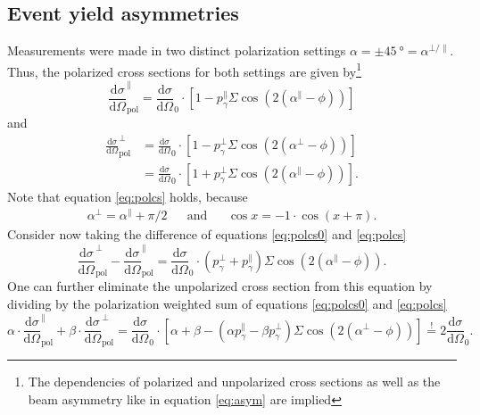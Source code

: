 \subsection{Event yield asymmetries}
Measurements were made in two distinct polarization settings $\alpha=\pm\SI{45}{\degree}=\alpha^{\bot/\parallel}$. Thus, the polarized cross sections for both settings are given by\footnote{The dependencies of polarized and unpolarized cross sections as well as the beam asymmetry like in equation \eqref{eq:asym} are implied}
\begin{equation}
	\frac{\text{d}\sigma}{\text{d}\Omega}_\text{pol}^\parallel=\frac{\text{d}\sigma}{\text{d}\Omega}_0\cdot\left[1-p_\gamma^\parallel\Sigma\cos\left(2\left(\alpha^\parallel-\phi\right)\right)\right]
	\label{eq:polcs0}
\end{equation}
and 
\begin{align}
	\frac{\text{d}\sigma}{\text{d}\Omega}_\text{pol}^\bot&=\frac{\text{d}\sigma}{\text{d}\Omega}_0\cdot\left[1-p_\gamma^\bot\Sigma\cos\left(2\left(\alpha^\bot-\phi\right)\right)\right]\label{eq:polcs00}\\
	&=\frac{\text{d}\sigma}{\text{d}\Omega}_0\cdot\left[1+p_\gamma^\bot\Sigma\cos\left(2\left(\alpha^\parallel-\phi\right)\right)\right].\label{eq:polcs}
\end{align}
Note that equation \eqref{eq:polcs} holds, because 
\begin{align*}
	\alpha^\bot=\alpha^\parallel+\pi/2 &&\text{and}&&\cos x = -1\cdot\cos(x+\pi).
\end{align*}
Consider now taking the difference of equations \eqref{eq:polcs0} and \eqref{eq:polcs}
\begin{equation}
	\frac{\text{d}\sigma}{\text{d}\Omega}_\text{pol}^\bot-\frac{\text{d}\sigma}{\text{d}\Omega}_\text{pol}^\parallel=\frac{\text{d}\sigma}{\text{d}\Omega}_0\cdot\left(p_\gamma^\bot+p_\gamma^\parallel\right)\Sigma\cos\left(2\left(\alpha^\parallel-\phi\right)\right).
\end{equation}
One can further eliminate the unpolarized cross section from this equation by dividing by the polarization weighted sum of equations \eqref{eq:polcs0} and \eqref{eq:polcs}
\begin{equation}
	\alpha\cdot\frac{\text{d}\sigma}{\text{d}\Omega}_\text{pol}^\parallel+\beta\cdot\frac{\text{d}\sigma}{\text{d}\Omega}_\text{pol}^\bot=\frac{\text{d}\sigma}{\text{d}\Omega}_0\cdot\left[\alpha+\beta-\left(\alpha p_\gamma^\parallel-\beta p_\gamma^\bot\right)\Sigma\cos\left(2\left(\alpha^\bot-\phi\right)\right)\right]\overset{!}{=}2\frac{\text{d}\sigma}{\text{d}\Omega}_0.
\end{equation}
